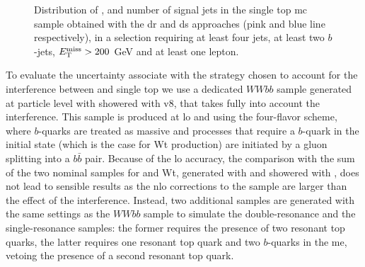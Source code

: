 \begin{figure}[h!]
\centering 
{}
\caption{Distribution of  \met,   \mtb and  number of signal jets in the single top \gls{mc} sample obtained with the \gls{dr} and \gls{ds} approaches (pink and blue line respectively), in a selection requiring at least four jets, at least two $b$-jets, $E_{\rm T}^{\mathrm{miss}}>200$ GeV and at least one lepton. 
}\label{fig:st_1L}
\end{figure}

To evaluate the uncertainty associate with the strategy chosen to account for the interference between \ttbar and single top
we use a dedicated $WWbb$ sample generated at particle level with \aNLO showered with \PY v8, that takes fully into account the interference.
This sample is produced at \gls{lo} and using the four-flavor scheme, where $b$-quarks are treated as massive and processes that require a $b$-quark in the initial state (which is the case for Wt production) are initiated by a gluon splitting into a $b\bar{b}$ pair. 
Because of the \gls{lo} accuracy, the comparison with the sum of the two nominal samples for \ttbar and Wt, generated with \PowhegBox and showered with \PY, does not lead to sensible 
results as the \gls{nlo} corrections to the \ttbar sample are larger than the effect of the interference. 
Instead, two additional samples are generated with the same settings as the $WWbb$ sample to simulate the double-resonance and the single-resonance samples: the former requires the presence of two resonant top quarks, the latter requires one resonant top quark and two $b$-quarks in the \gls{me}, vetoing the presence of a second resonant top quark.  


